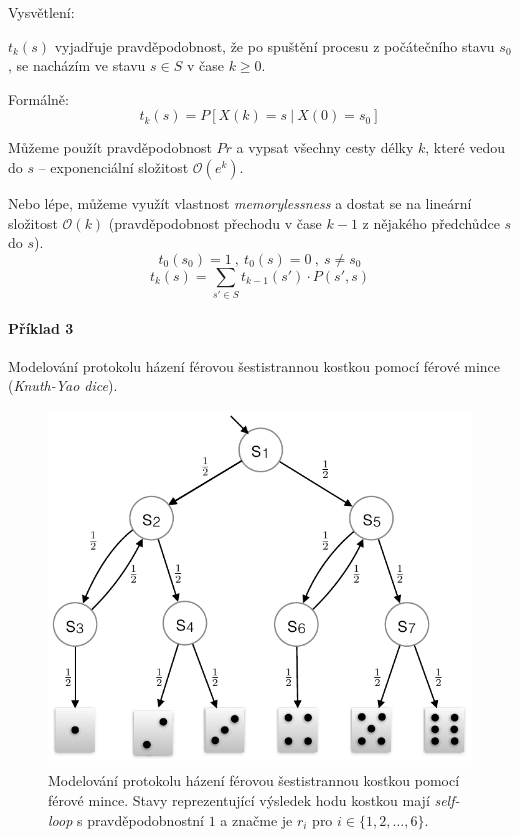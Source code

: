 \begin{compactitem}
    \item Vysvětlení: \begin{compactitem}
        \item $t_k(s)$ vyjadřuje pravděpodobnost, že po spuštění procesu z počátečního stavu $s_0$, se nacházím ve stavu $s \in S$ v čase $k \geq 0$.
    \end{compactitem}

    \item Formálně:
    $$ t_k(s) = P[X(k) = s ~|~ X(0) = s_0] $$

    \item Můžeme použít pravděpodobnost $Pr$ a vypsat všechny cesty délky $k$, které vedou do $s$ -- exponenciální složitost $\mathcal{O}(e^k)$.

    \item Nebo lépe, můžeme využít vlastnost \textit{memorylessness} a dostat se na lineární složitost $\mathcal{O}(k)$ (pravděpodobnost přechodu v čase $k-1$ z nějakého předchůdce $s$ do $s$).
    $$ t_0(s_0) = 1 ~,~ t_0(s) = 0 ~,~ s \not= s_0 $$
    $$ t_k(s) = \sum_{s' \in S} t_{k-1}(s') \cdot P(s', s) $$
\end{compactitem}

\paragraph*{Příklad 3} Modelování protokolu házení férovou šestistrannou kostkou pomocí férové mince (\textit{Knuth-Yao dice}).

\begin{figure}[H]
    \centering
    \includegraphics[width=0.75\linewidth]{priklad_2.pdf}
    \caption{Modelování protokolu házení férovou šestistrannou kostkou pomocí férové mince. Stavy reprezentující výsledek hodu kostkou mají \textit{self-loop} s pravděpodobnostní $1$ a značme je $r_i$ pro $i \in \{ 1, 2, \dots, 6 \}$.}
\end{figure}


